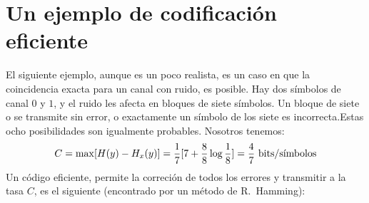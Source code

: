 \clearpage

\section{Un ejemplo de codificaci\'on eficiente}

El siguiente ejemplo, aunque es un poco realista, es un caso en que la
coincidencia exacta para un canal con ruido, es posible. Hay dos
s\'imbolos de canal $0$ y $1$, y el ruido les afecta en bloques de siete
s\'imbolos.  Un bloque de siete o se transmite sin error, o
exactamente un s\'imbolo de los siete es incorrecta.Estas ocho
posibilidades son igualmente probables. Nosotros tenemos:
\begin{equation}
C = \max [ H(y) - H_x(y) ]
= \frac{1}{7}[7 + \frac{8}{8}\log{\frac{1}{8}}]
= \frac{4}{7} \text{ bits}/\text{s\'{\i}mbolos}
\end{equation}
Un c\'odigo eficiente, permite la correci\'on de todos los errores y
transmitir a la tasa $C$, es el siguiente (encontrado por un m\'etodo de
R.\ Hamming):
